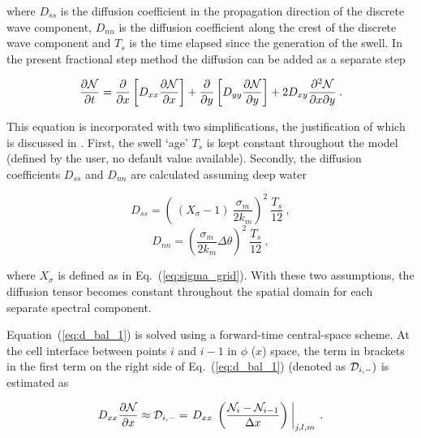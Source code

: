 \noindent
where $D_{ss}$ is the diffusion coefficient in the propagation direction of
the discrete wave component, $D_{nn}$ is the diffusion coefficient along the
crest of the discrete wave component and $T_s$ is the time elapsed since the
generation of the swell. In the present fractional step method the diffusion
can be added as a separate step


\begin{equation}
\frac{\partial {\cal N}}{\partial t} = 
\frac{\partial}{\partial x} \left [ D_{xx} \frac{\partial {\cal N}}{\partial x} \right ] +
\frac{\partial}{\partial y} \left [ D_{yy} \frac{\partial {\cal N}}{\partial y} \right ] +
   2 D_{xy} \frac{\partial^2 {\cal N}}{\partial x \partial y}
\: . \label{eq:d_bal_1} \end{equation}

\noindent
This equation is incorporated with two simplifications, the justification of
which is discussed in \cite{tol:OMB95}. First, the swell `age' $T_s$ is kept
constant throughout the model (defined by the user, no default value
available). Secondly, the diffusion coefficients $D_{ss}$ and $D_{nn}$ are
calculated assuming deep water


\begin{equation}
D_{ss} = \left ( \: (X_\sigma-1) \: \frac{\sigma_m}{2 k_m} \right )^2
\: \frac{T_s}{12} \: , \label{eq:Dss_d} \end{equation} \begin{equation}
D_{nn} =  \left ( \frac{\sigma_m}{2 k_m} \Delta \theta \right )^2
\: \frac{T_s}{12} \: , \label{eq:Dnn_d} \end{equation}

\noindent
where $X_\sigma$ is defined as in Eq.~(\ref{eq:sigma_grid}). With these two
assumptions, the diffusion tensor becomes constant throughout the spatial
domain for each separate spectral component.

Equation~(\ref{eq:d_bal_1}) is solved using a forward-time central-space
scheme. At the cell interface between points $i$ and $i-1$ in $\phi$ ($x$)
space, the term in brackets in the first term on the right side of
Eq.~(\ref{eq:d_bal_1}) (denoted as ${\cal D}_{i,-})$ is estimated as


\begin{equation}
D_{xx} \frac{\partial {\cal N}}{\partial x} \approx {\cal D}_{i,-} =
\left . D_{xx} \; \left ( \frac{{\cal N}_i - {\cal N}_{i-1}}{\Delta x} \right ) \: 
\right |_{j,l,m} \: . \label{eq:ddif_1} \end{equation}

